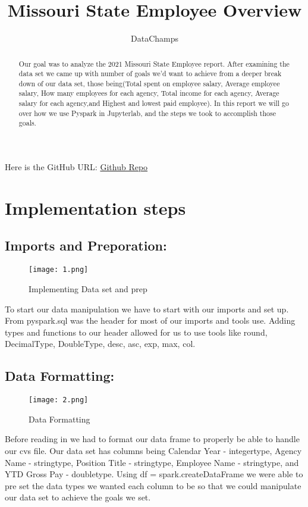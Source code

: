 \documentclass{article}
\title{Missouri State Employee Overview}
\author{DataChamps}
\begin{document}
\maketitle

Here is the GitHub URL: 
\href{https://github.com/srikarmiriyala/MissouriStateEmployeeProject}{Github Repo}


\begin{abstract}
Our goal was to analyze the 2021 Missouri State Employee report. After examining the data set we came up with number of goals we'd want to achieve from a deeper break down of our data set, those being(Total spent on employee salary, Average employee salary, How many employees for each agency, Total income for each agency, Average salary for each agency,and Highest and lowest paid employee). In this report we will go over how we use Pyspark in Jupyterlab, and the steps we took to accomplish those goals. 
\end{abstract}
\section{Implementation steps}
 
\subsection{ Imports and Preporation:} 
\begin{figure}[h!]
    \centering
    \texttt{[image: 1.png]}
    \caption{Implementing Data set and prep}
    \label{fig:enter-label}
\end{figure}
 
To start our data manipulation we have to start with our imports and set up. From pyspark.sql was the header for most of our imports and tools use. Adding types and functions to our header allowed for us to use tools like round, DecimalType, DoubleType, desc, asc, exp, max, col.
 
\subsection{Data Formatting:}
 
\begin{figure}[h!]
    \centering
    \texttt{[image: 2.png]}
    \caption{Data Formatting}
    \label{fig:enter-label}
\end{figure}
Before reading in we had to format our data frame to properly be able to handle our cvs file. Our data set has columns being Calendar Year - integertype, Agency Name - stringtype, Position Title - stringtype, Employee Name - stringtype, and  YTD Gross Pay - doubletype. 
Using df = spark.createDataFrame we were able to pre set the data types we wanted each column to be so that we could manipulate our data set to achieve the goals we set.
 
\end{document}
